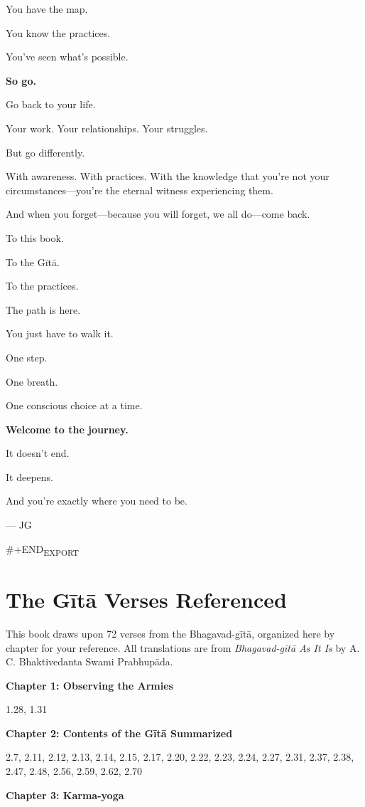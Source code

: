 \documentclass[11pt,twoside]{book}
\begin{document}
You have the map.

You know the practices.

You've seen what's possible.

\textbf{\textbf{So go.}}

Go back to your life.

Your work. Your relationships. Your struggles.

But go differently.

With awareness. With practices. With the knowledge that you're not your circumstances—you're the eternal witness experiencing them.

And when you forget—because you will forget, we all do—come back.

To this book.

To the Gītā.

To the practices.

The path is here.

You just have to walk it.

One step.

One breath.

One conscious choice at a time.

\textbf{\textbf{Welcome to the journey.}}

It doesn't end.

It deepens.

And you're exactly where you need to be.

— JG

\#+END\textsubscript{EXPORT}

\chapter*{The Gītā Verses Referenced}

This book draws upon 72 verses from the Bhagavad-gītā, organized here by chapter for your reference. All translations are from \emph{Bhagavad-gītā As It Is} by A. C. Bhaktivedanta Swami Prabhupāda.

\textbf{Chapter 1: Observing the Armies}

1.28, 1.31

\textbf{Chapter 2: Contents of the Gītā Summarized}

2.7, 2.11, 2.12, 2.13, 2.14, 2.15, 2.17, 2.20, 2.22, 2.23, 2.24, 2.27, 2.31, 2.37, 2.38, 2.47, 2.48, 2.56, 2.59, 2.62, 2.70

\textbf{Chapter 3: Karma-yoga}
\end{document}
